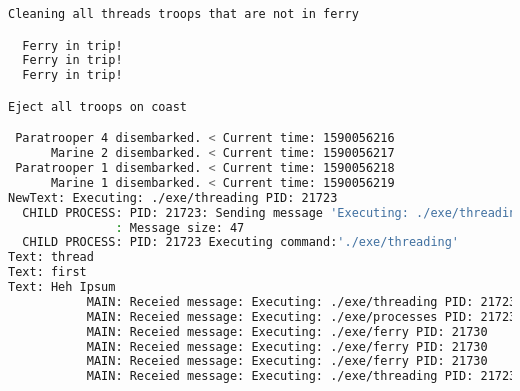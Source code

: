 \documentclass{article}
\begin{document}
\begin{lstlisting}[language=BASH]
Cleaning all threads troops that are not in ferry

  Ferry in trip!
  Ferry in trip!
  Ferry in trip!

Eject all troops on coast

 Paratrooper 4 disembarked. < Current time: 1590056216
      Marine 2 disembarked. < Current time: 1590056217
 Paratrooper 1 disembarked. < Current time: 1590056218
      Marine 1 disembarked. < Current time: 1590056219
NewText: Executing: ./exe/threading PID: 21723
  CHILD PROCESS: PID: 21723: Sending message 'Executing: ./exe/threading PID: 21723' to the MAIN process...
               : Message size: 47
  CHILD PROCESS: PID: 21723 Executing command:'./exe/threading'
Text: thread
Text: first
Text: Heh Ipsum
           MAIN: Receied message: Executing: ./exe/threading PID: 21723
           MAIN: Receied message: Executing: ./exe/processes PID: 21723
           MAIN: Receied message: Executing: ./exe/ferry PID: 21730
           MAIN: Receied message: Executing: ./exe/ferry PID: 21730
           MAIN: Receied message: Executing: ./exe/ferry PID: 21730
           MAIN: Receied message: Executing: ./exe/threading PID: 21723

\end{lstlisting}
\end{document}
